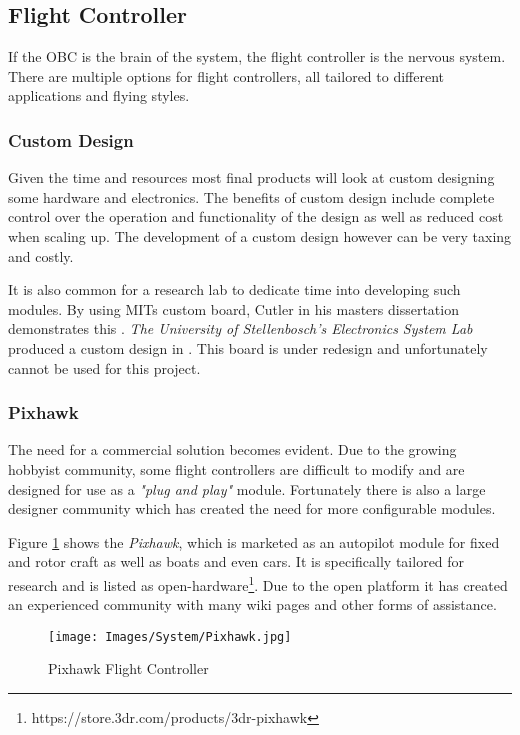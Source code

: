 		\subsection{Flight Controller}
		If the	OBC is the brain of the system, the flight controller is the nervous system. There are multiple options for flight controllers, all tailored to different applications and flying styles.
		
			\subsubsection{Custom Design}
			Given the time and resources most final products will look at custom designing some hardware and electronics. The benefits of custom design include complete control over the operation and functionality of the design as well as reduced cost when scaling up. The development of a custom design however can be very taxing and costly.
			
			It is also common for a research lab to dedicate time into developing such modules. By using MITs custom board, Cutler in his masters dissertation demonstrates this \cite{How2012}. \textit{The University of Stellenbosch's Electronics System Lab} produced a custom design in . This board is under redesign and unfortunately cannot be used for this project.
		
			\subsubsection{Pixhawk}
			The need for a commercial solution becomes evident. Due to the growing hobbyist community, some flight controllers are difficult to modify and are designed for use as a \textit{"plug and play"} module. Fortunately there is also a large designer community which has created the need for more configurable modules.
			
			Figure \ref{IM_Pixhawk} shows the \textit{Pixhawk}, which is marketed as an autopilot module for fixed and rotor craft as well as boats and even cars. It is specifically tailored for research and is listed as open-hardware\footnote{https://store.3dr.com/products/3dr-pixhawk}. Due to the open platform it has created an experienced community with many wiki pages and other forms of assistance.
			
			\begin{figure}[H]
				\centering
				\texttt{[image: Images/System/Pixhawk.jpg]}     
				\caption{Pixhawk Flight Controller}
				\label{IM_Pixhawk}
			\end{figure}
			
